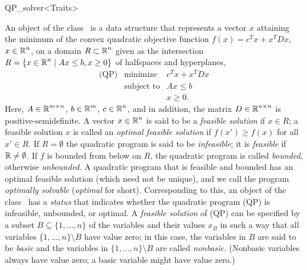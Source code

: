 
\begin{ccRefClass}{QP_solver<Traits>}

\ccDefinition
An object of the class \ccRefName\ is a data structure that represents
a vector $x$ attaining the minimum of the convex quadratic objective
function $f(x)=c^{T}x+x^{T}Dx$, $x \in \mbox{$\mathbb R$}^{n}$, on a domain $R \subset
\mbox{$\mathbb R$}^{n}$ given as the intersection $R=\{ x\in\mbox{$\mathbb R$}^n \mid \mbox{$Ax\leq b,
x\ge 0$}\}$ of halfspaces and hyperplanes,
\begin{eqnarray*}
\mbox{(QP)}&\mbox{minimize} & c^{T}x+x^{T}Dx \\
&\mbox{subject to}   & Ax \leq b \\
&& x \geq 0.
\end{eqnarray*}
Here, $A \in \mbox{$\mathbb R$}^{m \times n}$, $b \in \mbox{$\mathbb R$}^{m}$, $c \in \mbox{$\mathbb R$}^{n}$, and in
addition, the matrix $D \in \mbox{$\mathbb R$}^{n \times n}$ is positive-semidefinite.
A vector $x \in \mbox{$\mathbb R$}^{n}$ is said to be a \emph{feasible solution} if $x
\in R$; a feasible solution $x$ is called an \emph{optimal feasible
solution} if $f(x')\geq f(x)$ for all $x'\in R$.  If $R=\emptyset$ the
quadratic program is said to be \emph{infeasible}; it is
\emph{feasible} if $\mbox{$\mathbb R$}\not=\emptyset$.  If $f$ is bounded from below
on $R$, the quadratic program is called \emph{bounded}, otherwise
\emph{unbounded}.  A quadratic program that is feasible and bounded
has an optimal feasible solution (which need not be unique), and we
call the program \emph{optimally solvable} (\emph{optimal} for short).
Corresponding to this, an object of the class \ccRefName\ has a
\emph{status} that indicates whether the quadratic program (QP) is
infeasible, unbounded, or optimal.  A \emph{feasible solution} of (QP)
can be specified by a subset $B\subseteq\{1,\ldots,n\}$ of the
variables and their values $x_{B}$ in such a way that all variables
$\{1,\ldots,n\}\setminus B$ have value zero; in this case, the
variables in $B$ are said to be \emph{basic} and the variables in
$\{1,\ldots,n\}\setminus B$ are called \emph{nonbasic}.  (Nonbasic
variables always have value zero; a basic variable might have value
zero.)
%


\end{ccRefClass}
